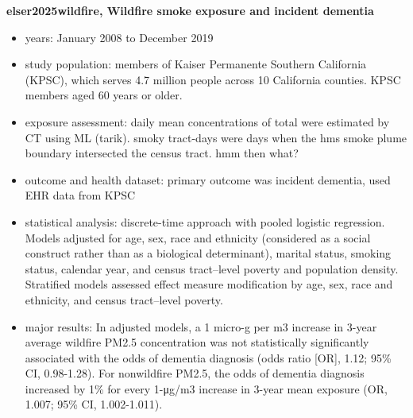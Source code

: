 \textbf{elser2025wildfire, Wildfire smoke exposure and incident dementia}
\begin{itemize}
    \item years: January 2008 to December 2019
    \item study population: members of Kaiser Permanente Southern California (KPSC), which serves 4.7 million people across 10 California counties. KPSC members aged 60 years or older. 
    \item exposure assessment: daily mean concentrations of total \PM were estimated by CT using ML (tarik). smoky tract-days were days when the hms smoke plume boundary intersected the census tract. hmm then what? 
    \item outcome and health dataset: primary outcome was incident dementia, used EHR data from KPSC
    \item statistical analysis: discrete-time approach with pooled logistic regression. Models adjusted for age, sex, race and ethnicity (considered as a social construct rather than as a biological determinant), marital status, smoking status, calendar year, and census tract–level poverty and population density. Stratified models assessed effect measure modification by age, sex, race and ethnicity, and census tract–level poverty.
    \item major results: In adjusted models, a 1 micro-g per m3 increase in 3-year average wildfire PM2.5 concentration was not statistically significantly associated with the odds of dementia diagnosis (odds ratio [OR], 1.12; 95\% CI, 0.98-1.28). For nonwildfire PM2.5, the odds of dementia diagnosis increased by 1\% for every 1-μg/m3 increase in 3-year mean exposure (OR, 1.007; 95\% CI, 1.002-1.011).
\end{itemize}


